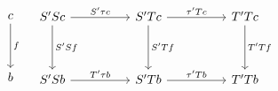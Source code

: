 \[ \begin{array}{cc}

\begin{tikzcd}[column sep=huge, row sep=huge]
	c \arrow[d, "f"]\\
	b
\end{tikzcd}

&

\begin{tikzcd}[column sep=huge, row sep=huge]
	S'Sc \arrow[r, "S'\tau c"] \arrow[d, "S'S f"] & S'Tc \arrow[r, "\tau' Tc"] \arrow[d, "S'T f"] & T'Tc \arrow[d, "T'T f"] \\
	S'Sb \arrow[r, "T'\tau b"] & S'Tb \arrow[r, "\tau' Tb"] & T'Tb
\end{tikzcd}

\end{array} \]